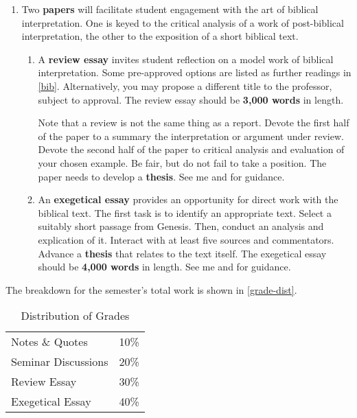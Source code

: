 \documentclass[titlepage]{article}
\begin{document}
\begin{enumerate}
	\item Two \textbf{papers} will facilitate student engagement with the
	art of biblical interpretation. One is keyed to the critical analysis of
	a work of post-biblical interpretation, the other to the exposition of a
	short biblical text.

	\begin{enumerate}

		\item A \textbf{review essay} invites student reflection on a model
		work of biblical interpretation. Some pre-approved options are
		listed as further readings in \autoref{bib}. Alternatively, you may
		propose a different title to the professor, subject to approval. The
		review essay should be \textbf{3,000 words} in length.

		Note that a review is not the same thing as a report. Devote the
		first half of the paper to a summary the interpretation or argument
		under review. Devote the second half of the paper to critical
		analysis and evaluation of your chosen example. Be fair, but do not
		fail to take a position. The paper needs to develop a
		\textbf{thesis}. See me and \cite[chs 3, 5–7, 11]{rlgs} for
		guidance.

		\item An \textbf{exegetical essay} provides an opportunity for
		direct work with the biblical text. The first task is to identify an
		appropriate text. Select a suitably short passage from Genesis.
		Then, conduct an analysis and explication of it. Interact with at
		least five sources and commentators. Advance a \textbf{thesis} that
		relates to the text itself. The exegetical essay should be
		\textbf{4,000 words} in length. See me and \cite[chs 3, 5, 8,
		11]{rlgs} for guidance.

	\end{enumerate}

\end{enumerate}

The breakdown for the semester's total work is shown in
\autoref{grade-dist}.

\begin{table}[htbp]
  \centering
  {\lining
  \begin{tabular}{lr}
    \toprule
    Notes \& Quotes     & 10\% \\
    Seminar Discussions & 20\% \\
    Review Essay        & 30\% \\
    Exegetical Essay    & 40\% \\
    \bottomrule
  \end{tabular}}
  \caption{Distribution of Grades}
  \label{grade-dist}
\end{table}
\end{document}
